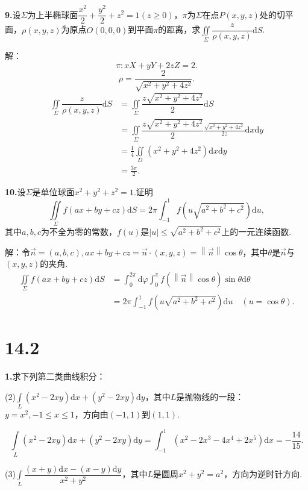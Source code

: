 \documentclass[12pt, a4paper]{article}
\newcommand{\dif}{\mathrm{d}}
\begin{document}
\textbf{9.}设\(\Sigma\)为上半椭球面\(\dfrac{x^2}{2} + \dfrac{y^2}{2} + z^2 = 1(z \geq 0)\)，\(\pi\)为\(\Sigma\)在点\(P(x, y, z)\)处的切平面，\(\rho(x, y, z)\)为原点\(O(0, 0, 0)\)到平面\(\pi\)的距离，求\(\iint\limits_\Sigma \dfrac{z}{\rho(x, y, z)} \dif S\).

解：
\[\pi:xX + yY + 2zZ = 2.\]
\[\rho = \frac{2}{\sqrt{x^2 + y^2 + 4z^2}}.\]
\begin{align*}
\iint\limits_\Sigma \dfrac{z}{\rho(x, y, z)} \dif S &= \iint\limits_\Sigma \dfrac{z\sqrt{x^2 + y^2 + 4z^2}}{2} \dif S \\
&= \iint\limits_\Sigma \dfrac{z\sqrt{x^2 + y^2 + 4z^2}}{2} \frac{\sqrt{x^2 + y^2 + 4z^2}}{2z} \dif x \dif y \\
&= \frac{1}{4}\iint\limits_D (x^2 + y^2 + 4z^2) \dif x \dif y \\
&= \frac{3\pi}{2}.
\end{align*}

\textbf{10.}设\(\Sigma\)是单位球面\(x^2 + y^2 + z^2 = 1\).证明
\[\iint\limits_\Sigma f(ax + by + cz) \dif S = 2\pi \int_{-1}^{1} f(u\sqrt{a^2 + b^2 + c^2}) \dif u,\]
其中\(a, b, c\)为不全为零的常数，\(f(u)\)是\(|u| \leq \sqrt{a^2 + b^2 + c^2}\)上的一元连续函数.

解：令\(\vec{n} = (a, b, c), ax + by + cz = \vec{n} \cdot (x, y, z) = \left\|\vec{n}\right\|\cos\theta\)，其中\(\theta\)是\(\vec{n}\)与\((x, y, z)\)的夹角.
\begin{align*}
\iint\limits_\Sigma f(ax + by + cz) \dif S &= \int_{0}^{2\pi} \dif \varphi \int_0^\pi f(\left\|\vec{n}\right\|\cos\theta)\sin\theta \dif \theta \\
&= 2\pi \int_{-1}^{1} f(u\sqrt{a^2 + b^2 + c^2}) \dif u \quad (u = \cos\theta).
\end{align*}

\section*{14.2}
\textbf{1.}求下列第二类曲线积分：

(2)\(\int\limits_L (x^2 - 2xy) \dif x + (y^2 - 2xy) \dif y\)，其中\(L\)是抛物线的一段：\(y = x^2, -1 \leq x \leq 1\)，方向由\((-1, 1)\)到\((1, 1)\).

\[\int\limits_L (x^2 - 2xy) \dif x + (y^2 - 2xy) \dif y = \int_{-1}^{1} (x^2 - 2x^3 - 4x^4 + 2x^5) \dif x = -\frac{14}{15}.\]

(3)\(\int\limits_L \dfrac{(x + y) \dif x - (x - y) \dif y}{x^2 + y^2}\)，其中\(L\)是圆周\(x^2 + y^2 = a^2\)，方向为逆时针方向.
\end{document}
